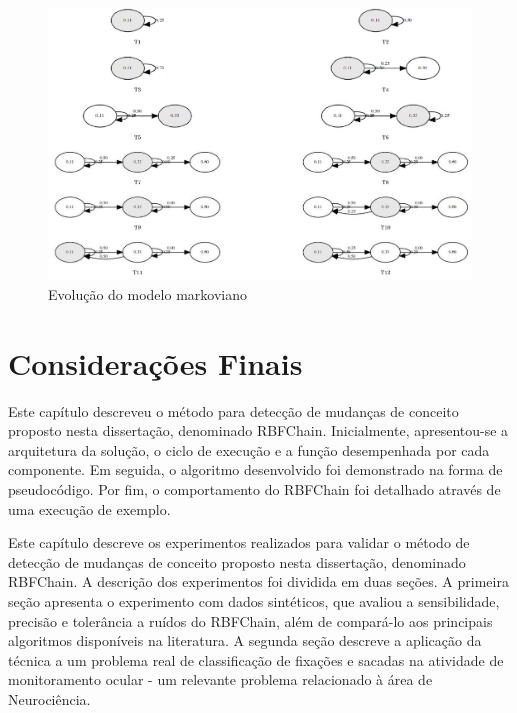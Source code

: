 \documentclass[msc, classic, a4paper]{ufbathesis}
\begin{document}
\begin{landscape}
\begin{figure}[ht]
    \begin{center}
        \includegraphics[scale=0.4]{imagens/evolucao_markov.png}
        \caption{Evolução do modelo markoviano}
        \label{fig:evolucao_markov}
    \end{center}
\end{figure}
\end{landscape}

\section{Considerações Finais}
\label{sec:rbfchain_consideracoes_finais}

Este capítulo descreveu o método para detecção de mudanças de conceito proposto nesta dissertação, denominado RBFChain.
Inicialmente, apresentou-se a arquitetura da solução, o ciclo de execução e a função desempenhada por cada componente.
Em seguida, o algoritmo desenvolvido foi demonstrado na forma de pseudocódigo.
Por fim, o comportamento do RBFChain foi detalhado através de uma execução de exemplo.

 \label{experimentos_e_resultados}

Este capítulo descreve os experimentos realizados para validar o método de detecção de mudanças de conceito proposto nesta dissertação, denominado RBFChain.
A descrição dos experimentos foi dividida em duas seções.
A primeira seção apresenta o experimento com dados sintéticos, que avaliou a sensibilidade, precisão e tolerância a ruídos do RBFChain, além de compará-lo aos principais algoritmos disponíveis na literatura.
A segunda seção descreve a aplicação da técnica a um problema real de classificação de fixações e sacadas na atividade de monitoramento ocular - um relevante problema relacionado à área de Neurociência. 
\end{document}
